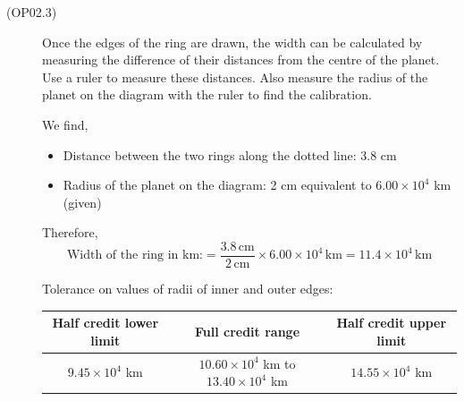 \begin{description}
\item[(OP02.3)]
Once the edges of the ring are drawn, the width can be calculated by measuring the
difference of their distances from the centre of the planet. Use a ruler to measure these
distances. Also measure the radius of the planet on the diagram with the ruler to find the
calibration.

We find,
\begin{itemize}
\item Distance between the two rings along the dotted line: 3.8 cm
\item Radius of the planet on the diagram: 2 cm equivalent to $6.00\times10^4$ km (given)
\end{itemize}
Therefore,
\[
\text{Width of the ring in km:}
= \frac{3.8\,\mathrm{cm}}{2\,\mathrm{cm}}\times 6.00\times10^4\,\mathrm{km}
= 11.4\times10^4\,\mathrm{km}
\]

Tolerance on values of radii of inner and outer edges:
\begin{center}
\begin{tabular}{|c|c|c|}
\hline
Half credit lower limit & Full credit range & Half credit upper limit\\
\hline
$9.45\times10^4$ km & $10.60\times10^4$ km to $13.40\times10^4$ km & $14.55\times10^4$ km\\
\hline
\end{tabular}
\end{center}
\end{description}
